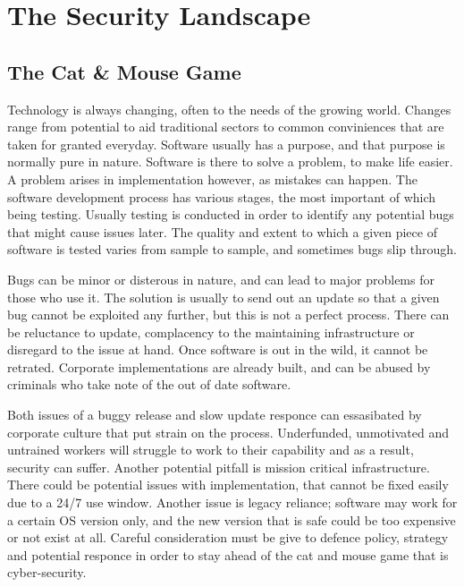 



\chapter{The Security Landscape}
\section{The Cat \& Mouse Game}
Technology is always changing, often to the needs of the growing world. Changes range from potential to aid traditional sectors to common conviniences that are taken for granted everyday.
Software usually has a purpose, and that purpose is normally pure in nature. Software is there to solve a problem, to make life easier. A problem arises in implementation however, as mistakes can happen.
The software development process has various stages, the most important of which being testing. Usually testing is conducted in order to identify any potential bugs that might cause issues later.
The quality and extent to which a given piece of software is tested varies from sample to sample, and sometimes bugs slip through.

Bugs can be minor or disterous in nature, and can lead to major problems for those who use it.
The solution is usually to send out an update so that a given bug cannot be exploited any further, but this is not a perfect process. There can be reluctance to update, complacency to the maintaining infrastructure or disregard to the issue at hand.
Once software is out in the wild, it cannot be retrated. Corporate implementations are already built, and can be abused by criminals who take note of the out of date software.

Both issues of a buggy release and slow update responce can essasibated by corporate culture that put strain on the process. Underfunded, unmotivated and untrained workers will struggle to work to their capability and as a result, security can suffer. 
Another potential pitfall is mission critical infrastructure. There could be potential issues with implementation, that cannot be fixed easily due to a 24/7 use window. Another issue is legacy reliance; software may work for a certain OS version only, 
and the new version that is safe could be too expensive or not exist at all. Careful consideration must be give to defence policy, strategy and potential responce in order to stay ahead of the cat and mouse game that is cyber-security.


